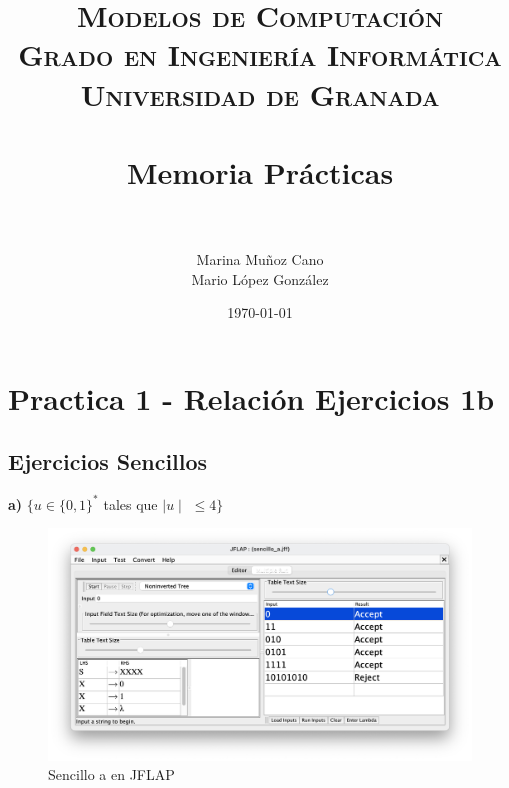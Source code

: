 

\title{	
\normalfont \normalsize 
\textsc{\textbf{Modelos de Computación} \\ Grado en Ingeniería Informática \\ Universidad de Granada} \\ [25pt] %
\horrule{0.5pt} \\[0.4cm] %
\huge Memoria Prácticas \\ %
\horrule{2pt} \\[0.5cm] %
}

\author{ 
    Marina Muñoz Cano
    \\
    Mario López González
} 

\date{\normalsize\today} %




\maketitle %

\newpage %

\tableofcontents %
\listoffigures %

\newpage

\section{Practica 1 - Relación Ejercicios 1b}

\subsection{Ejercicios Sencillos}

\textbf{a)}  $\{ u \in \{0,1\}^{\ast} $ tales que $\mid u \mid$ $\leq 4 \}$

\begin{figure}[H] 
	\centering
	\includegraphics[scale=0.35]{../practica_1/images/sencillo_a.png} 
	\caption{Sencillo a en JFLAP} 
    \label{fig:sencillo_a}
\end{figure}


